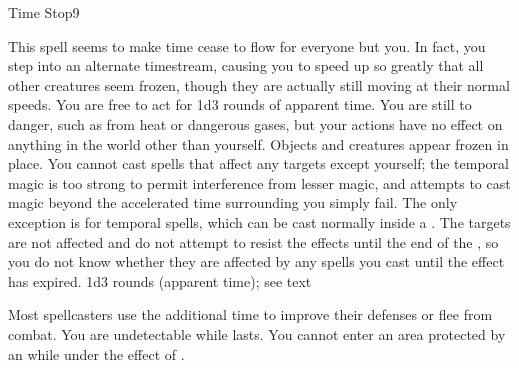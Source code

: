 \begin{spellsection}{Time Stop}{9}
\begin{spellheader}
\end{spellheader}
\begin{spellcontent}
    \spelleffect This spell seems to make time cease to flow for everyone but you. In fact, you step into an alternate timestream, causing you to speed up so greatly that all other creatures seem frozen, though they are actually still moving at their normal speeds. You are free to act for 1d3 rounds of apparent time. You are still \vulnerable to danger, such as from heat or dangerous gases, but your actions have no effect on anything in the world other than yourself. Objects and creatures appear frozen in place. You cannot cast spells that affect any targets except yourself; the temporal magic is too strong to permit interference from lesser magic, and attempts to cast magic beyond the accelerated time surrounding you simply fail. The only exception is for temporal spells, which can be cast normally inside a . The targets are not affected and do not attempt to resist the effects until the end of the , so you do not know whether they are affected by any spells you cast until the effect has expired.
    \spelldur 1d3 rounds (apparent time); see text
\end{spellcontent}
\begin{spellfooter}
    \spellnotes Most spellcasters use the additional time to improve their defenses or flee from combat. You are undetectable while  lasts. You cannot enter an area protected by an  while under the effect of .
\end{spellfooter}
\end{spellsection}

